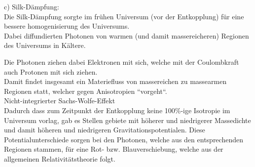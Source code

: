 \documentclass[11pt, a4paper]{article}
\begin{document}
\newpage
c) Silk-Dämpfung:\\
Die Silk-Dämpfung sorgte im frühen Universum (vor der Entkopplung) für eine bessere homogenisierung des 
Universums. \\
Dabei diffundierten Photonen von warmen  (und damit massereicheren) Regionen des Universums in Kältere. 
\begin{center}
\end{center}
Die Photonen ziehen dabei Elektronen mit sich, welche mit der Coulombkraft auch Protonen mit sich ziehen.\\
Damit findet insgesamt ein Materiefluss von massereichen zu massearmen Regionen statt, welcher gegen Anisotropien 
``vorgeht``.
\newline
\vspace{0.0cm}
\\
Nicht-integrierter Sachs-Wolfe-Effekt \\
Dadurch dass zum Zeitpunkt der Entkopplung keine 100\%-ige Isotropie im Universum vorlag, gab es Stellen 
gebiete mit höherer und niedrigerer Massedichte und damit
höheren und niedrigeren Gravitationspotentialen. Diese Potentialunterschiede sorgen bei den Photonen,
welche aus den entsprechenden Regionen stammen, für eine Rot- bzw. Blauverschiebung, welche aus der 
allgemeinen Relativitätstheorie folgt.
\end{document}
